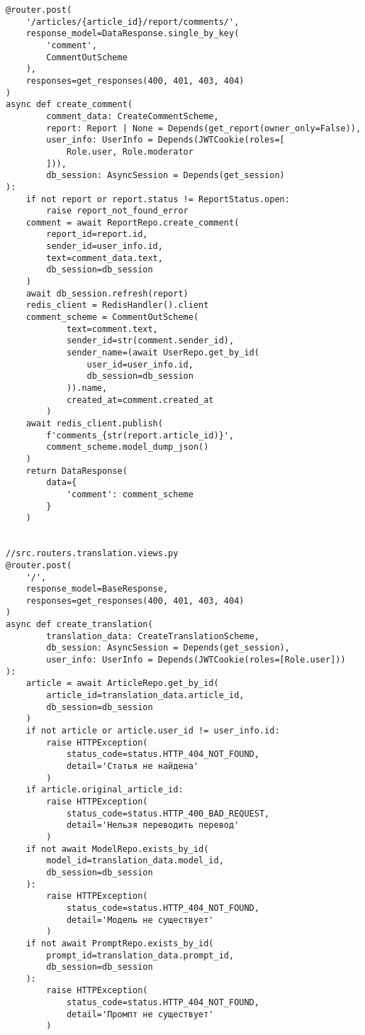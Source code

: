 \begin{lstlisting}
@router.post(
    '/articles/{article_id}/report/comments/',
    response_model=DataResponse.single_by_key(
        'comment',
        CommentOutScheme
    ),
    responses=get_responses(400, 401, 403, 404)
)
async def create_comment(
        comment_data: CreateCommentScheme,
        report: Report | None = Depends(get_report(owner_only=False)),
        user_info: UserInfo = Depends(JWTCookie(roles=[
            Role.user, Role.moderator
        ])),
        db_session: AsyncSession = Depends(get_session)
):
    if not report or report.status != ReportStatus.open:
        raise report_not_found_error
    comment = await ReportRepo.create_comment(
        report_id=report.id,
        sender_id=user_info.id,
        text=comment_data.text,
        db_session=db_session
    )
    await db_session.refresh(report)
    redis_client = RedisHandler().client
    comment_scheme = CommentOutScheme(
            text=comment.text,
            sender_id=str(comment.sender_id),
            sender_name=(await UserRepo.get_by_id(
                user_id=user_info.id,
                db_session=db_session
            )).name,
            created_at=comment.created_at
        )
    await redis_client.publish(
        f'comments_{str(report.article_id)}',
        comment_scheme.model_dump_json()
    )
    return DataResponse(
        data={
            'comment': comment_scheme
        }
    )


//src.routers.translation.views.py
@router.post(
    '/',
    response_model=BaseResponse,
    responses=get_responses(400, 401, 403, 404)
)
async def create_translation(
        translation_data: CreateTranslationScheme,
        db_session: AsyncSession = Depends(get_session),
        user_info: UserInfo = Depends(JWTCookie(roles=[Role.user]))
):
    article = await ArticleRepo.get_by_id(
        article_id=translation_data.article_id,
        db_session=db_session
    )
    if not article or article.user_id != user_info.id:
        raise HTTPException(
            status_code=status.HTTP_404_NOT_FOUND,
            detail='Статья не найдена'
        )
    if article.original_article_id:
        raise HTTPException(
            status_code=status.HTTP_400_BAD_REQUEST,
            detail='Нельзя переводить перевод'
        )
    if not await ModelRepo.exists_by_id(
        model_id=translation_data.model_id,
        db_session=db_session
    ):
        raise HTTPException(
            status_code=status.HTTP_404_NOT_FOUND,
            detail='Модель не существует'
        )
    if not await PromptRepo.exists_by_id(
        prompt_id=translation_data.prompt_id,
        db_session=db_session
    ):
        raise HTTPException(
            status_code=status.HTTP_404_NOT_FOUND,
            detail='Промпт не существует'
        )



\end{lstlisting}
